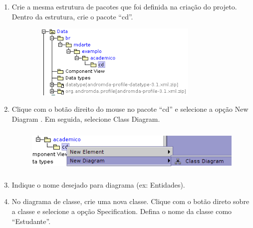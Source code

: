 \begin{enumerate}
	\item Crie a mesma estrutura de pacotes que foi definida na criação do projeto.
	Dentro da estrutura, crie o pacote “cd”.
		\begin{figure}[!htb]
			\centering
			\includegraphics[width=250pt,height=100pt]{imgs/tutorial-mdarte-0000.png}
		\end{figure}
	\item Clique com o botão direito do mouse no pacote “cd” e selecione a opção New Diagram .
	Em seguida, selecione Class Diagram.
		
		\begin{figure}[!htb]
			\centering
			\includegraphics[width=400pt,height=60pt]{imgs/tutorial-mdarte-0001.png}
		\end{figure}
	
	\item Indique o nome desejado para diagrama (ex: Entidades).
	
	\item No diagrama de classe, crie uma nova classe. Clique com o botão direto
	sobre a classe e selecione a opção Specification. Defina o nome da classe como “Estudante”.
	

\end{enumerate}
